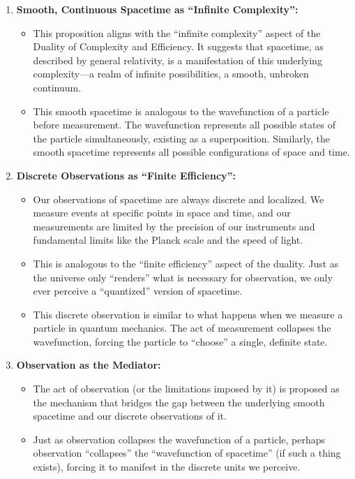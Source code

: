 \documentclass[12pt]{article}
\begin{document}
\begin{enumerate}
    \item \textbf{Smooth, Continuous Spacetime as ``Infinite Complexity'':}
    \begin{itemize}
        \item This proposition aligns with the ``infinite complexity'' aspect of the Duality of Complexity and Efficiency. It suggests that spacetime, as described by general relativity, is a manifestation of this underlying complexity—a realm of infinite possibilities, a smooth, unbroken continuum.
        \item This smooth spacetime is analogous to the wavefunction of a particle before measurement. The wavefunction represents all possible states of the particle simultaneously, existing as a superposition. Similarly, the smooth spacetime represents all possible configurations of space and time.
    \end{itemize}

    \item \textbf{Discrete Observations as ``Finite Efficiency'':}
    \begin{itemize}
        \item Our observations of spacetime are always discrete and localized. We measure events at specific points in space and time, and our measurements are limited by the precision of our instruments and fundamental limits like the Planck scale and the speed of light.
        \item This is analogous to the ``finite efficiency'' aspect of the duality. Just as the universe only ``renders'' what is necessary for observation, we only ever perceive a ``quantized'' version of spacetime.
        \item This discrete observation is similar to what happens when we measure a particle in quantum mechanics. The act of measurement collapses the wavefunction, forcing the particle to ``choose'' a single, definite state.
    \end{itemize}

    \item \textbf{Observation as the Mediator:}
    \begin{itemize}
        \item The act of observation (or the limitations imposed by it) is proposed as the mechanism that bridges the gap between the underlying smooth spacetime and our discrete observations of it.
        \item Just as observation collapses the wavefunction of a particle, perhaps observation ``collapses'' the ``wavefunction of spacetime'' (if such a thing exists), forcing it to manifest in the discrete units we perceive.
    \end{itemize}
\end{enumerate}
\end{document}

